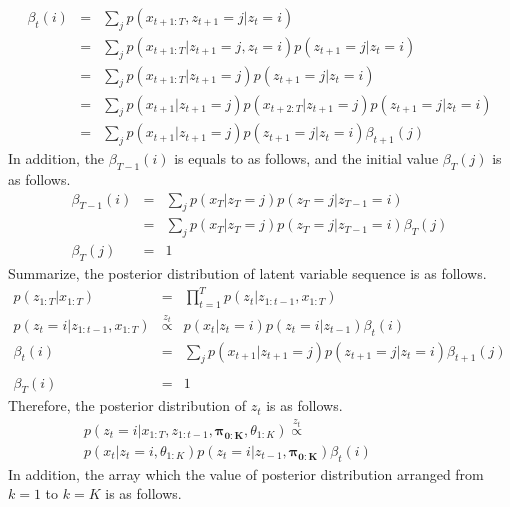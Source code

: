 \documentclass[a4paper]{article}
\newcommand{\proptoas}[1]{\overset{#1}{\propto}}
\begin{document}
	\begin{eqnarray}
		\beta_t(i)
		&=&
		\sum_{j}{p(x_{t+1:T}, z_{t+1} = j | z_t = i)} \\
		&=&
		\sum_{j}{p(x_{t+1:T} | z_{t+1} = j, z_t = i) p(z_{t+1} = j | z_t = i)} \\
		&=&
		\sum_{j}{p(x_{t+1:T} | z_{t+1} = j) p(z_{t+1} = j | z_t = i)} \\
		&=&
		\sum_{j}{p(x_{t+1} | z_{t+1} = j) p(x_{t+2:T} | z_{t+1} = j) p(z_{t+1} = j | z_t = i)} \\
		&=&
		\sum_{j}{p(x_{t+1} | z_{t+1} = j) p(z_{t+1} = j | z_t = i) \beta_{t+1}(j)}
	\end{eqnarray}
	In addition, the $\beta_{T-1}(i)$ is equals to as follows, and the initial value $\beta_T(j)$ is as follows.
	\begin{eqnarray}
		\beta_{T-1}(i)
		&=&
		\sum_{j}{p(x_{T} | z_{T} = j) p(z_{T} = j | z_{T-1} = i)}\\
		&=&
		\sum_{j}{p(x_{T} | z_{T} = j) p(z_{T} = j | z_{T-1} = i) \beta_T(j)} \\
		\beta_T(j) &=& 1
	\end{eqnarray}
	Summarize, the posterior distribution of latent variable sequence is as follows.
	\begin{eqnarray}
		p(z_{1:T} | x_{1:T})
		&=&
		\prod_{t=1}^{T}{p(z_{t} | z_{1:t-1}, x_{1:T})} \\
		p(z_{t} = i | z_{1:t-1}, x_{1:T})
		&\proptoas{z_t}&
		p(x_t | z_t = i) p(z_t = i | z_{t-1}) \beta_t(i) \\
		\beta_t(i)
		&=&
		\sum_{j}{p(x_{t+1} | z_{t+1} = j) p(z_{t+1} = j | z_t = i) \beta_{t+1}(j)} \nonumber \\
		\\
		\beta_T(i) &=& 1
	\end{eqnarray}
	Therefore, the posterior distribution of $z_t$ is as follows.
	\begin{eqnarray}
		p(z_t = i | x_{1:T}, z_{1:t-1}, \boldsymbol{\pi_{0:K}}, \theta_{1:K})
		\proptoas{z_t} ~~~~~~~~~~~~~~~~~~~~~~~~~~~~~~~~~~~~~~~~~~ \nonumber \\
		p(x_t | z_t = i, \theta_{1:K}) p(z_t = i | z_{t-1}, \boldsymbol{\pi_{0:K}}) \beta_t(i)
	\end{eqnarray}
	In addition, the array which the value of posterior distribution arranged from $k=1$ to $k=K$ is as follows.
\end{document}
